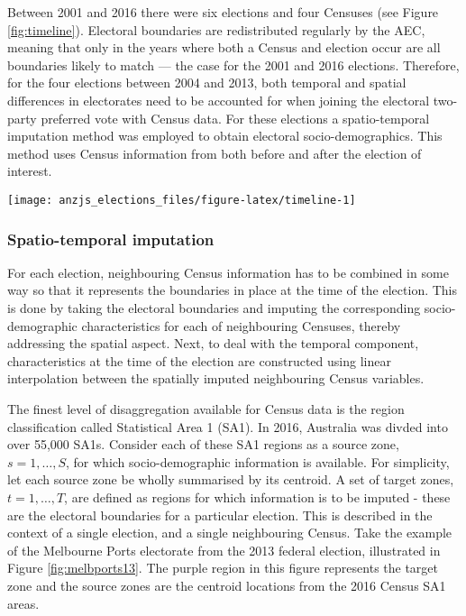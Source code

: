 \documentclass[times, doublespace]{anzsauth}
\let\origfigure\figure
\let\endorigfigure\endfigure
\renewenvironment{figure}[1][2] {
    \expandafter\origfigure\expandafter[htbp]
} {
    \endorigfigure
}
\begin{document}
Between 2001 and 2016 there were six elections and four Censuses (see Figure \ref{fig:timeline}). Electoral boundaries are redistributed regularly by the AEC, meaning that only in the years where both a Census and election occur are all boundaries likely to match --- the case for the 2001 and 2016 elections. Therefore, for the four elections between 2004 and 2013, both temporal and spatial differences in electorates need to be accounted for when joining the electoral two-party preferred vote with Census data. For these elections a spatio-temporal imputation method was employed to obtain electoral socio-demographics. This method uses Census information from both before and after the election of interest.

\begin{figure}[h]

{\centering \texttt{[image: anzjs\_elections\_files/figure-latex/timeline-1]} 

}

\caption{Timeline of Australian elections and Censuses. They do not always occur in the same year.}\label{fig:timeline}
\end{figure}

\hypertarget{spatio-temporal-imputation}{%
\subsubsection*{Spatio-temporal imputation}\label{spatio-temporal-imputation}}

For each election, neighbouring Census information has to be combined in some way so that it represents the boundaries in place at the time of the election. This is done by taking the electoral boundaries and imputing the corresponding socio-demographic characteristics for each of neighbouring Censuses, thereby addressing the spatial aspect. Next, to deal with the temporal component, characteristics at the time of the election are constructed using linear interpolation between the spatially imputed neighbouring Census variables.

The finest level of disaggregation available for Census data is the region classification called Statistical Area 1 (SA1). In 2016, Australia was divded into over 55,000 SA1s. Consider each of these SA1 regions as a source zone, \(s = 1,\dots,S\), for which socio-demographic information is available. For simplicity, let each source zone be wholly summarised by its centroid. A set of target zones, \(t = 1,\dots,T\), are defined as regions for which information is to be imputed - these are the electoral boundaries for a particular election. This is described in the context of a single election, and a single neighbouring Census. Take the example of the Melbourne Ports electorate from the 2013 federal election, illustrated in Figure \ref{fig:melbports13}. The purple region in this figure represents the target zone and the source zones are the centroid locations from the 2016 Census SA1 areas.
\end{document}
